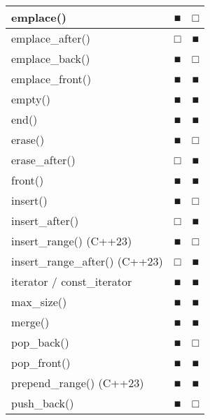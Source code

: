 \begin{longtable}{|l|l|l|}
emplace()                                    & ■             & □                      \\ \hline
emplace\_after()                             & □             & ■                      \\ \hline
emplace\_back()                              & ■             & □                      \\ \hline
emplace\_front()                             & ■             & ■                      \\ \hline
empty()                                      & ■             & ■                      \\ \hline
end()                                        & ■             & ■                      \\ \hline
erase()                                      & ■             & □                      \\ \hline
erase\_after()                               & □             & ■                      \\ \hline
front()                                      & ■             & ■                      \\ \hline
insert()                                     & ■             & □                      \\ \hline
insert\_after()                              & □             & ■                      \\ \hline
insert\_range() (C++23)                      & ■             & □                      \\ \hline
insert\_range\_after() (C++23)               & □             & ■                      \\ \hline
iterator / const\_iterator                   & ■             & ■                      \\ \hline
max\_size()                                  & ■             & ■                      \\ \hline
merge()                                      & ■             & ■                      \\ \hline
pop\_back()                                  & ■             & □                      \\ \hline
pop\_front()                                 & ■             & ■                      \\ \hline
prepend\_range() (C++23)                     & ■             & ■                      \\ \hline
push\_back()                                 & ■             & □                      \\ \hline

\end{longtable}
